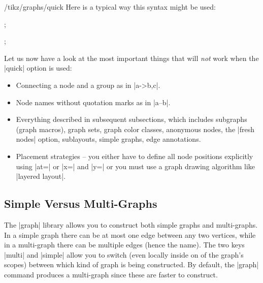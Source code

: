 \begin{key}{/tikz/graphs/quick}
  Here is a typical way this syntax might be used:
\begin{codeexample}[]
\tikz {};
\end{codeexample}

\begin{codeexample}[]
\tikz {};
\end{codeexample}

  Let us now have a look at the most important things that will
  \emph{not} work when the |quick| option is used:

  \begin{itemize}
  \item Connecting a node and a group as in |a->{b,c}|.
  \item Node names without quotation marks as in |a--b|.
  \item Everything described in subsequent subsections, which includes
    subgraphs (graph macros), graph sets, graph color classes,
    anonymous nodes, the |fresh nodes| option, sublayouts, simple
    graphs, edge annotations.
  \item Placement strategies -- you either have to define all node
    positions explicitly using |at=| or |x=| and |y=| or you must use
    a graph drawing algorithm like |layered layout|.
  \end{itemize}  
\end{key}


\subsection{Simple Versus Multi-Graphs}

\label{section-library-graphs-simple}

The |graph| library allows you to construct both simple graphs and
multi-graphs. In a simple graph there can be at most one edge between
any two vertices, while in a multi-graph there can be multiple edges
(hence the name). The two keys |multi| and |simple| allow you to
switch (even locally inside on of the graph's scopes) between which
kind of graph is being constructed. By default, the |graph| command
produces a multi-graph since these are faster to construct.

